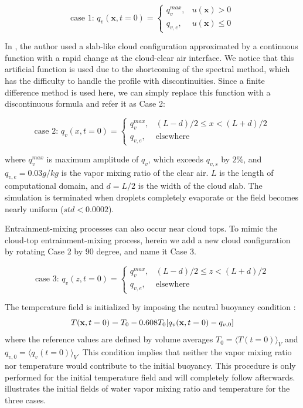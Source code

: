 \begin{equation}
\mbox{case 1: } q_v(\mathbf{x},t=0) = 
\left\{\begin{array}{lr}
q_v^{max}, & u(\mathbf{x}) > 0\\
q_{v,e}, & u(\mathbf{x}) \le 0
\end{array}\right.\label{case1}
\end{equation}

In \cite{Kumar2012Cloud}, the author used a slab-like cloud configuration approximated by a continuous 
function with a rapid change at the cloud-clear air interface. We notice that this artificial function is 
used due to the shortcoming of the spectral method, which has the difficulty to handle the profile with discontinuities. Since a finite difference method is used here, we can simply replace this function with a discontinuous formula and refer it as Case 2:

\begin{equation}
\mbox{case 2: } q_v(x,t=0) = 
\left\{\begin{array}{lr}
q_v^{max}, & (L-d)/2 \le x < (L+d)/2\\
q_{v,e}, & \mbox{elsewhere}
\end{array}\right.\label{case2}
\end{equation}

where $q_v^{max}$ is maximum amplitude of $q_v$, which exceeds $q_{v,s}$ by
$2\%$, and $q_{v,e} = 0.03g/kg$ is the vapor mixing ratio of the clear air. $L$
is the length of computational domain, and $d = L/2$ is the width of the cloud
slab. The simulation is terminated when droplets completely evaporate or the
field becomes nearly uniform ($std<0.0002$).

Entrainment-mixing processes can also occur near cloud tops. To mimic the
cloud-top entrainment-mixing process, herein we add a new cloud configuration
by rotating Case 2 by $90$ degree, and name it Case 3.

\begin{equation}
\mbox{case 3: } q_v(z,t=0) = 
\left\{\begin{array}{lr}
q_v^{max}, & (L-d)/2 \le z < (L+d)/2\\
q_{v,e}, & \mbox{elsewhere}
\end{array}\right.\label{case3}
\end{equation}

The temperature field is initialized by imposing the neutral buoyancy condition \cite{Kumar2014Lagrangian}:
\begin{equation}
T(\mathbf{x},t = 0) = T_0 - 0.608T_0[q_v(\mathbf{x},t = 0) - q_{v,0}]
\end{equation}
where the reference values are defined by volume averages $T_0 = \langle
T(t=0)\rangle_V$ and $q_{v,0} = \langle q_v(t=0)\rangle_V$. This condition
implies that neither the vapor mixing ratio nor temperature would contribute to
the initial buoyancy. This procedure is only performed for the initial
temperature field and will completely follow  afterwards.
 illustrates the initial fields of water vapor mixing
ratio and temperature for the three cases.

